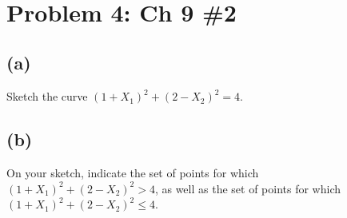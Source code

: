 \documentclass[11pt]{article}
\begin{document}
    \begin{center}
    \end{center}
    { \hspace*{\fill} \\}
    
    \hypertarget{problem-4-ch-9-2}{%
\section{Problem 4: Ch 9 \#2}\label{problem-4-ch-9-2}}

\hypertarget{a}{%
\subsection{(a)}\label{a}}

Sketch the curve \((1 + X_1)^2 + (2 - X_2)^2 = 4\).

\hypertarget{b}{%
\subsection{(b)}\label{b}}

On your sketch, indicate the set of points for which
\((1 + X_1)^2 + (2 - X_2)^2 > 4\), as well as the set of points for
which \((1 + X_1)^2 + (2 - X_2)^2 \le 4\).
\end{document}
